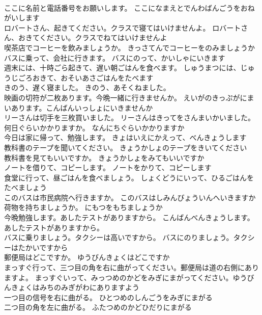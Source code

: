 \documentclass[8pt]{extreport}
\begin{document}
\begin{CJK}{UTF8}{min}
\\	ここに名前と電話番号をお願いします。	ここになまえとでんわばんごうをおねがいします 
\\	ロバートさん、起きてください。クラスで寝てはいけませんよ。	ロバートさん、おきてください。クラスでねてはいけませんよ 
\\	喫茶店でコーヒーを飲みましょうか。	きっさてんでコーヒーをのみましょうか 
\\	バスに乗って、会社に行きます。	バスにのって、かいしゃにいきます 
\\	週末には、十時ごら起きて、遅い朝ごはんを食べます。	しゅうまつには、じゅうじごろおきて、おそいあさごはんをたべます 
\\	きのう、遅く寝ました。	きのう、あそくねました。 
\\	映画の切符が二枚あります。今晩一緒に行きませんか。	えいがのきっぷがにまいあります。こんばんいっしょにいきませんか 
\\	リーさんは切手を三枚買いました。	リーさんはきってをさんまいかいました。 
\\	何日ぐらいかかりますか。	なんにちぐらいかかりますか 
\\	今日は家に帰って、勉強します。	きょはいえにかえって、べんきょうします 
\\	教科書のテープを聞いてください。	きょうかしょのテープをきいてください 
\\	教科書を見てもいいですか。	きょうかしょをみてもいいですか 
\\	ノートを借りて、コピーします。	ノートをかりて、コピーします 
\\	食堂に行って、昼ごはんを食べましょう。	しょくどうにいって、ひるごはんをたべましょう 
\\	このバスは市民病院へ行きますか。	このバスはしみんびょういんへいきますか 
\\	荷物を持ちましょうか。	にもつをもちましょうか 
\\	今晩勉強します。あしたテストがありますから。	こんばんべんきょうします。あしたテストがありますから。 
\\	バスに乗りましょう。タクシーは高いですから。	バスにのりましょう。タクシーはたかいですから 
\\	郵便局はどこですか。	ゆうびんきょくはどこですか 
\\	まっすぐ行って、三つ目の角を右に曲がってください。郵便局は道の右側にありますよ。	まっすぐいって、みっつめのかどをみぎにまがってください。ゆうびんきょくはみちのみぎがわにありますよう 
\\	一つ目の信号を右に曲がる。	ひとつめのしんごうをみぎにまがる 
\\	二つ目の角を左に曲がる。	ふたつめのかどひだりにまがる 

\end{CJK}
\end{document}
